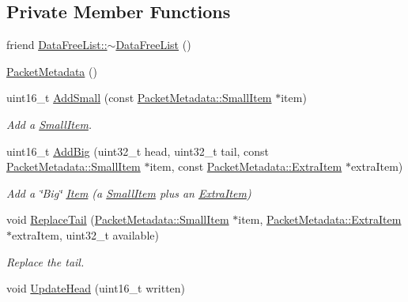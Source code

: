 \subsection*{Private Member Functions}
\begin{DoxyCompactItemize}
\item 
friend \hyperlink{classns3_1_1PacketMetadata_a343187327aa7336b54e71cc3b1df881d}{Data\+Free\+List\+::$\sim$\+Data\+Free\+List} ()
\item 
\hyperlink{classns3_1_1PacketMetadata_a78447d800a9c3b6c85a3f38a09682b00}{Packet\+Metadata} ()
\item 
uint16\+\_\+t \hyperlink{classns3_1_1PacketMetadata_a9d74d684e6a7448a6790220c6c8e99f2}{Add\+Small} (const \hyperlink{structns3_1_1PacketMetadata_1_1SmallItem}{Packet\+Metadata\+::\+Small\+Item} $\ast$item)
\begin{DoxyCompactList}\small\item\em Add a \hyperlink{structns3_1_1PacketMetadata_1_1SmallItem}{Small\+Item}. \end{DoxyCompactList}\item 
uint16\+\_\+t \hyperlink{classns3_1_1PacketMetadata_ae89a0bf5e3dcd624bd37bc8ca67544da}{Add\+Big} (uint32\+\_\+t head, uint32\+\_\+t tail, const \hyperlink{structns3_1_1PacketMetadata_1_1SmallItem}{Packet\+Metadata\+::\+Small\+Item} $\ast$item, const \hyperlink{structns3_1_1PacketMetadata_1_1ExtraItem}{Packet\+Metadata\+::\+Extra\+Item} $\ast$extra\+Item)
\begin{DoxyCompactList}\small\item\em Add a \char`\"{}\+Big\char`\"{} \hyperlink{structns3_1_1PacketMetadata_1_1Item}{Item} (a \hyperlink{structns3_1_1PacketMetadata_1_1SmallItem}{Small\+Item} plus an \hyperlink{structns3_1_1PacketMetadata_1_1ExtraItem}{Extra\+Item}) \end{DoxyCompactList}\item 
void \hyperlink{classns3_1_1PacketMetadata_a0ad8fd1e4af8eaafca676b4cc3d9749b}{Replace\+Tail} (\hyperlink{structns3_1_1PacketMetadata_1_1SmallItem}{Packet\+Metadata\+::\+Small\+Item} $\ast$item, \hyperlink{structns3_1_1PacketMetadata_1_1ExtraItem}{Packet\+Metadata\+::\+Extra\+Item} $\ast$extra\+Item, uint32\+\_\+t available)
\begin{DoxyCompactList}\small\item\em Replace the tail. \end{DoxyCompactList}\item 
void \hyperlink{classns3_1_1PacketMetadata_a3baa0c324423e6fd600b31858aa4ade9}{Update\+Head} (uint16\+\_\+t written)

\end{DoxyCompactItemize}
